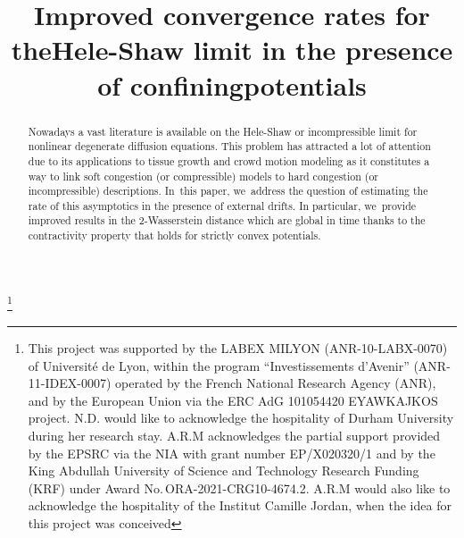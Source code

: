 \documentclass[JEP,XML,SOM,Unicode,published]{cedram}
\theoremstyle{plain}
\theoremstyle{remark}
\begin{document}
\title{Improved convergence rates for the\nobreakspace Hele-Shaw limit in the presence of confining\nobreakspace potentials}

\author[\initial{N.} \lastname{David}]{ }
\address{CNRS, Laboratoire de Mathématiques Raphaël Salem,\\
Avenue de l'Université, BP.12, 76801, Saint-Étienne-du-Rouvray, France}

\author[\initial{A.} \middlename{R.} \lastname{Mészáros}]{  }
\address{Department of Mathematical Sciences, University of Durham,\\ Durham DH1 3LE, United Kingdom}

\author[\initial{F.} \lastname{Santambrogio}]{ }
\address{Universite Claude Bernard Lyon 1, CNRS, École Centrale de Lyon, INSA Lyon, Université Jean Monnet,
Institut Camille Jordan, UMR5208,\\
43 bd du 11 novembre 1918, 69622 Villeurbanne Cedex}

\thanks{This project was supported by the LABEX MILYON (ANR-10-LABX-0070) of Université de Lyon, within the program ``Investissements d'Avenir'' (ANR-11-IDEX-0007) operated by the French National Research Agency (ANR), and by the European Union via the ERC AdG 101054420 EYAWKAJKOS project.
N.D. would like to acknowledge the hospitality of Durham University during her research stay. A.R.M acknowledges the partial support provided by the EPSRC via the NIA with grant number EP/X020320/1 and by the King Abdullah University of Science and Technology Research Funding (KRF) under Award No.\,ORA-2021-CRG10-4674.2. A.R.M would also like to acknowledge the hospitality of the Institut Camille Jordan, when the idea for this project was conceived}

\begin{abstract}
Nowadays a vast literature is available on the Hele-Shaw or incompressible limit for nonlinear degenerate diffusion equations. This problem has attracted a lot of attention due to its applications to tissue growth and crowd motion modeling as it constitutes a way to link soft congestion (or compressible) models to hard congestion (or incompressible) descriptions. In~this paper, we~address the question of estimating the rate of this asymptotics in the presence of external drifts. In particular, we~provide improved results in the 2-Wasserstein distance which are global in time thanks to the contractivity property that holds for strictly convex potentials.
\end{abstract}
\end{document}
